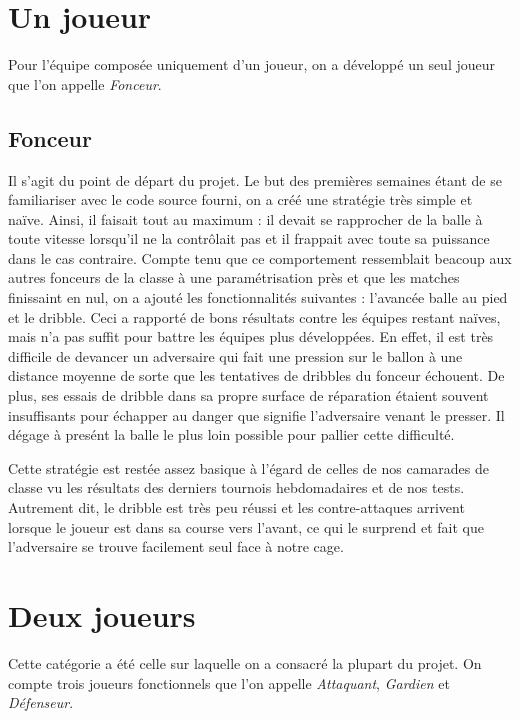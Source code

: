 \documentclass[12pt,a4paper]{article}
\begin{document}
\section{Un joueur}
Pour l'\'equipe compos\'ee uniquement d'un joueur, on a d\'evelopp\'e un seul 
joueur que l'on appelle {\itshape Fonceur}. 

\subsection*{Fonceur}
Il s'agit du point de d\'epart du projet. Le but des premi\`eres semaines 
\'etant de se familiariser avec le code source fourni, on a cr\'e\'e une 
strat\'egie tr\`es simple et na\"ive. 
Ainsi, il faisait tout au maximum : il devait se rapprocher de la balle \`a 
toute vitesse lorsqu'il ne la contr\^olait pas et il frappait avec toute sa 
puissance dans le cas contraire. 
Compte tenu que ce comportement ressemblait beacoup aux autres fonceurs de la 
classe \`a une param\'etrisation pr\`es et que les matches finissaint en nul, on 
a ajout\'e les fonctionnalit\'es suivantes : l'avanc\'ee balle au pied et le 
dribble. 
Ceci a rapport\'e de bons r\'esultats contre les \'equipes restant 
na\"ives, mais n'a pas suffit pour battre les \'equipes plus d\'evelopp\'ees. 
En effet, il est tr\`es difficile de devancer un adversaire qui fait une 
pression sur le ballon \`a une distance moyenne de sorte que les tentatives de 
dribbles du fonceur \'echouent.
De plus, ses essais de dribble dans sa propre surface de r\'eparation 
\'etaient souvent insuffisants pour \'echapper au danger que signifie 
l'adversaire venant le presser. Il d\'egage \`a pres\'ent la balle le plus loin 
possible pour pallier cette difficult\'e.

Cette strat\'egie est rest\'ee assez basique \`a l'\'egard de celles de nos 
camarades de classe vu les r\'esultats des derniers tournois hebdomadaires et 
de nos tests. Autrement dit, le dribble est tr\`es peu r\'eussi et les 
contre-attaques arrivent lorsque le joueur est dans sa course vers l'avant, ce 
qui le surprend et fait que l'adversaire se trouve facilement seul face \`a 
notre cage.

\section{Deux joueurs}
Cette cat\'egorie a \'et\'e celle sur laquelle on a consacr\'e la plupart du 
projet. On compte trois joueurs fonctionnels que l'on appelle 
{\itshape Attaquant}, {\itshape Gardien} et {\itshape D\'efenseur}. 
\end{document}
